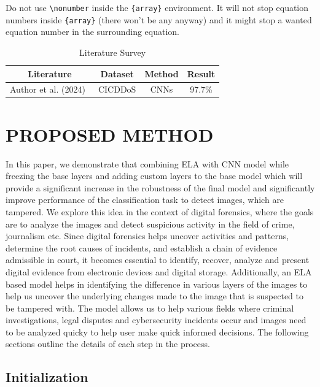 \documentclass{ieeeaccess}
\begin{document}
Do not use \verb|\nonumber| inside the \verb|{array}| environment. It
will not stop equation numbers inside \verb|{array}| (there won't be
any anyway) and it might stop a wanted equation number in the
surrounding equation.



\begin{table}[t!]
\centering
\begin{tabular}{|c|c|c|c|}
\hline
\textbf{Literature} & \textbf{Dataset} & \textbf{Method} & \textbf{Result} \\
\hline
Author et al. (2024)~\cite{chandio2022precise} & CICDDoS\-2019 & CNNs & 97.7\% \\
\hline
\end{tabular}
\caption{Literature Survey}
\label{tab:my_label}
\end{table}






\section{PROPOSED METHOD}

In this paper, we demonstrate that combining ELA with CNN model while freezing the base layers and adding custom layers to the base model which will provide a significant increase in the robustness of the final model and significantly improve performance of the classification task to detect images, which are tampered. We explore this idea in the context of digital forensics, where the goals are to analyze the images and detect suspicious activity in the field of crime, journalism etc. Since digital forensics helps uncover activities and patterns, determine the root causes of incidents, and establish a chain of evidence admissible in court, it becomes essential to identify, recover, analyze and present digital evidence from electronic devices and digital storage. Additionally, an ELA based model helps in identifying the difference in various layers of the images to help us uncover the underlying changes made to the image that is suspected to be tampered with. The model allows us to help various fields where criminal investigations, legal disputes and cybersecurity incidents occur and images need to be analyzed quicky to help user make quick informed decisions. The following sections outline the details of each step in the process.

\subsection{Initialization}
\end{document}
